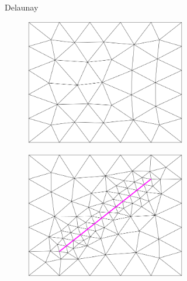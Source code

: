 \begin{figure}[p]
\begin{subfigure}[b]{\textwidth}
\begin{subfigure}[b]{0.32\textwidth}
        \end{subfigure}
        \caption{Delaunay}
        \label{fig:Gmsh-Delaunay}
    \end{subfigure}
    \begin{subfigure}[b]{\textwidth}
        \centering
        \begin{subfigure}[b]{0.32\textwidth}
            \centering
            \includegraphics[width=\textwidth]{report/Images/Software/Gmsh meshing algorithms/gmsh_meshing_algorithms_frontal.png}
        \end{subfigure}
        \begin{subfigure}[b]{0.32\textwidth}
            \centering
            \includegraphics[width=\textwidth]{report/Images/Software/Gmsh meshing algorithms/gmsh_meshing_algorithms_embedded_frontal.png}

\end{subfigure}
\end{subfigure}
\end{figure}
